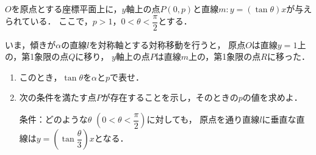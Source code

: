 \documentclass[../../main.tex]{subfiles}
\begin{document}
$O$を原点とする座標平面上に，$y$軸上の点$P(0,p)$と直線$m:y=(\tan\theta)x$が与えられている．
ここで，$p>1$，$\displaystyle 0<\theta<\dfrac{\pi}{2}$とする．

いま，傾きが$\alpha$の直線$l$を対称軸とする対称移動を行うと，
原点$O$は直線$y=1$上の，第1象限の点$Q$に移り，
$y$軸上の点$P$は直線$m$上の，第1象限の点$R$に移った．
\begin{enumerate}
  \item このとき，$\tan\theta$を$\alpha$と$p$で表せ．
  \item 次の条件を満たす点$P$が存在することを示し，そのときの$p$の値を求めよ．

    条件：どのような$\theta$ $\displaystyle \left( 0<\theta<\dfrac{\pi}{2} \right)$に対しても，
    原点を通り直線$l$に垂直な直線は$\displaystyle y = \left( \tan\dfrac{\theta}{3} \right) x$となる．
\end{enumerate}
\end{document}

